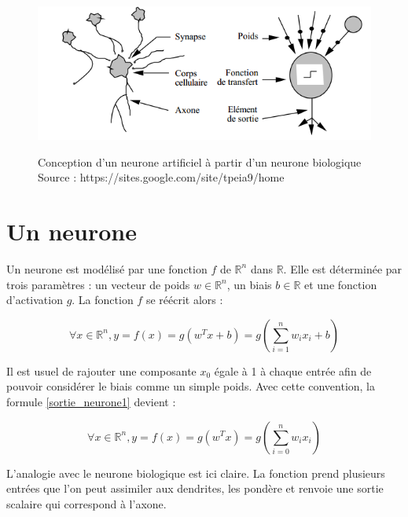 \begin{figure}[!h]
\begin{center}
	{\includegraphics[scale=0.4]{images/chapter1/neurone_bio.png}\label{neurone}}
  \caption{Conception d'un neurone artificiel à partir d'un neurone biologique \\ Source : https://sites.google.com/site/tpeia9/home}
\end{center}
\end{figure}

\section{Un neurone}

\begin{definition}[Neurone]
Un neurone est modélisé par une fonction $f$ de $\mathbb{R}^n$ dans $\mathbb{R}$. Elle est déterminée par trois paramètres : un vecteur de poids $w \in \mathbb{R}^n$, un biais $b \in \mathbb{R}$ et une fonction d'activation $g$. La fonction $f$ se réécrit alors :

\begin{equation}
\forall x \in \mathbb{R}^n, y = f(x) = g(w^Tx+b) = g(\sum_{i=1}^{n}{w_ix_i}+b)
\label{sortie_neurone1}
\end{equation}
\end{definition}

\begin{remark}
Il est usuel de rajouter une composante $x_0$ égale à 1 à chaque entrée afin de pouvoir considérer le biais comme un simple poids. Avec cette convention, la formule \ref{sortie_neurone1} devient :

\begin{equation}
\forall x \in \mathbb{R}^n, y = f(x) = g(w^Tx) = g(\sum_{i=0}^{n}{w_ix_i})
\label{sortie_neurone2}
\end{equation}
\end{remark}

L'analogie avec le neurone biologique est ici claire. La fonction prend plusieurs entrées que l'on peut assimiler aux dendrites, les pondère et renvoie une sortie scalaire qui correspond à l'axone.

